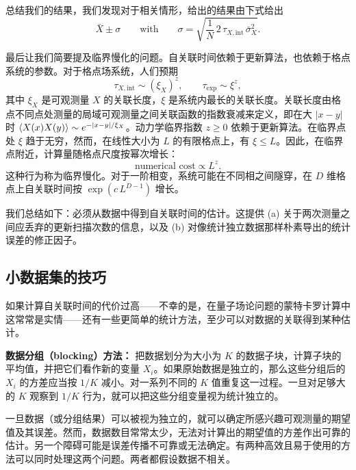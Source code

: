总结我们的结果，我们发现对于相关情形，给出的结果由下式给出
\begin{equation}
  \bar{X} \pm \sigma \qquad \text{with}\qquad
  \sigma = \sqrt{\frac{1}{N}\,2\,\tau_{X,\mathrm{int}}\,\bar{\sigma}_X^2} .
\end{equation}

最后让我们简要提及临界慢化的问题。自关联时间依赖于更新算法，也依赖于格点系统的参数。对于格点场系统，人们预期
\begin{equation}
  \tau_{X,\mathrm{int}} \sim (\xi_X)^z, \qquad \tau_\mathrm{exp} \sim \xi^z,
\end{equation}
其中 $\xi_X$ 是可观测量 $X$ 的关联长度，$\xi$ 是系统内最长的关联长度。关联长度由格点不同点处测量的局域可观测量之间关联函数的指数衰减来定义，即在大 $|x-y|$ 时 $\left\langle X(x)X(y) \right\rangle \sim e^{-|x-y|/\xi_X}$。动力学临界指数 $z \geq 0$ 依赖于更新算法。在临界点处 $\xi$ 趋于无穷，然而，在线性大小为 $L$ 的有限格点上，有 $\xi \leq L$。因此，在临界点附近，计算量随格点尺度按幂次增长：
\begin{equation}
  \text{numerical cost} \propto L^z .
\end{equation}
这种行为称为临界慢化。对于一阶相变，系统可能在不同相之间隧穿，在 $D$ 维格点上自关联时间按 $\exp(c\,L^{D-1})$ 增长。

我们总结如下：必须从数据中得到自关联时间的估计。这提供 (a) 关于两次测量之间应丢弃的更新扫描次数的信息，以及 (b) 对像统计独立数据那样朴素导出的统计误差的修正因子。

\subsection{小数据集的技巧}

如果计算自关联时间的代价过高——不幸的是，在量子场论问题的蒙特卡罗计算中这常常是实情——还有一些更简单的统计方法，至少可以对数据的关联得到某种估计。

\textbf{数据分组（blocking）方法：} 把数据划分为大小为 $K$ 的数据子块，计算子块的平均值，并把它们看作新的变量 $X_i$。如果原始数据是独立的，那么这些分组后的 $X_i$ 的方差应当按 $1/K$ 减小。对一系列不同的 $K$ 值重复这一过程。一旦对足够大的 $K$ 观察到 $1/K$ 行为，就可以把这些分组变量视为统计独立的。

一旦数据（或分组结果）可以被视为独立的，就可以确定所感兴趣可观测量的期望值及其误差。然而，数据数目常常太少，无法对计算出的期望值的方差作出可靠的估计。另一个障碍可能是误差传播不可靠或无法确定。有两种高效且易于使用的方法可以同时处理这两个问题。两者都假设数据不相关。

